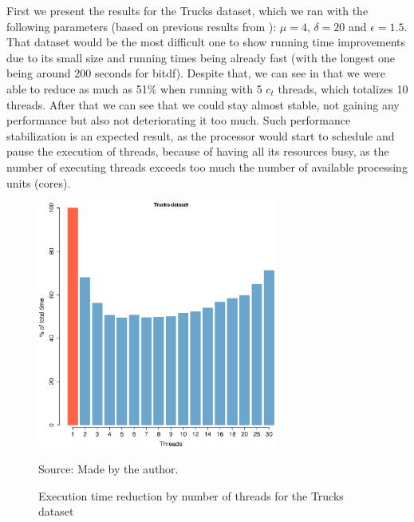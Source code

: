 {First we present the results for the Trucks dataset, which we ran with the following parameters (based on previous
results from ): $\mu=4$, $\delta=20$ and $\epsilon=1.5$. That dataset would be the most difficult one
to show running time improvements due to its small size and running times being already fast (with the longest one being
around 200 seconds for \ac{bitdf}). Despite that, we can see in  that we were able to reduce
as much as 51\% when running with 5 $c_t$ threads, which totalizes 10 threads. After that we can see that we could stay
almost stable, not gaining any performance but also not deteriorating it too much. Such performance stabilization is an
expected result, as the processor would start to schedule and pause the execution of threads, because of having all its
resources busy, as the number of executing threads exceeds too much the number of available processing units (cores).

\begin{figure}[h!]
    \centering
    \caption{Execution time reduction by number of threads for the Trucks dataset}
    \centerline{\includegraphics[width=0.7\textwidth]{images/Trucks_thread.eps}}
    \footnotesize{Source: Made by the author.}
    \label{fig:trucks_threads}
\end{figure}

}
